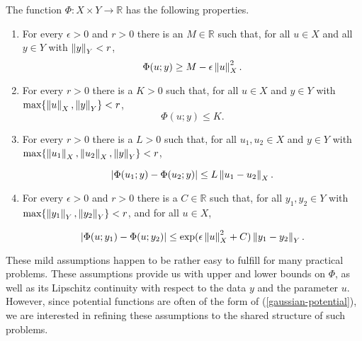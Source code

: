 \begin{assumption}\label{assumption-ll}
  The function $\Phi : X \times Y \rightarrow \mathbb{R}$ has the following properties.
  
  \begin{enumerate}
  \item For every $\epsilon > 0$ and $r > 0$ there is an $M \in \mathbb{R}$ such that, for all $u \in X$ and all $y \in Y$ with $\left\lVert y\right\rVert_Y < r$,
    \begin{equation*}
      \Phi(u; y) \ge M - \epsilon\left\lVert u\right\rVert_X^2.
    \end{equation*}
  \item For every $r > 0$ there is a $K > 0$ such that, for all $u \in X$ and $y \in Y$ with $\text{max}\{\left\lVert u\right\rVert_X, \left\lVert y\right\rVert_Y\} < r$,
    \begin{equation*}
      \Phi(u; y) \le K.
    \end{equation*}

  \item For every $r > 0$ there is a $L > 0$ such that, for all $u_1, u_2 \in X$ and $y \in Y$ with $\text{max}\{\left\lVert u_1\right\rVert_X, \left\lVert u_2\right\rVert_X, \left\lVert y\right\rVert_Y\} < r$,

    \begin{equation*}
      |\Phi(u_1; y) - \Phi(u_2; y)| \le L\left\lVert u_1 - u_2\right\rVert_X.
    \end{equation*}

  \item For every $\epsilon > 0$ and $r > 0$ there is a $C \in \mathbb{R}$ such that, for all $y_1, y_2 \in Y$ with $\text{max}\{\left\lVert y_1\right\rVert_Y, \left\lVert y_2\right\rVert_Y\} < r$, and for all $u \in X$,

    \begin{equation*}
      |\Phi(u; y_1) - \Phi(u; y_2)| \le \exp(\epsilon\left\lVert u\right\rVert_X^2 + C)\left\lVert y_1 - y_2\right\rVert_Y.
    \end{equation*}
  \end{enumerate}
\end{assumption}

These mild assumptions happen to be rather easy to fulfill for many practical problems. These assumptions provide us with upper and lower bounds on $\Phi$, as well as its Lipschitz continuity with respect to the data $y$ and the parameter $u$.  However, since potential functions are often of the form of (\ref{gaussian-potential}), we are interested in refining these assumptions to the shared structure of such problems.

